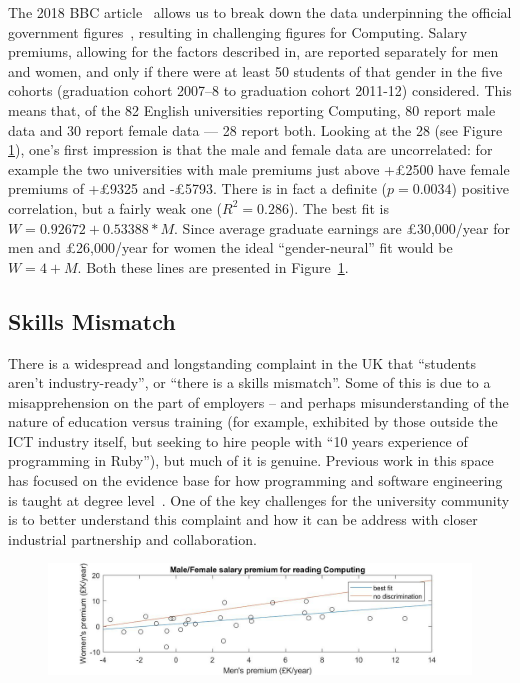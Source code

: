 \documentclass[conference]{IEEEtran}
\begin{document}
The 2018 BBC article~\cite{BBC2018f} allows us to break down the data
underpinning the official government figures~\cite{DfE2018d},
resulting in challenging figures for Computing. Salary premiums,
allowing for the factors described in\cite[\S IIB]{davenport-et-al:cep2019}, are reported separately for
men and women, and only if there were at least 50 students of that
gender in the five cohorts (graduation cohort 2007--8 to graduation
cohort 2011-12) considered. This means that, of the 82 English
universities reporting Computing, 80 report male data and 30 report
female data --- 28 report both. Looking at the 28 (see Figure
\ref{fig:BBC}), one's first impression is that the male and female
data are uncorrelated: for example the two universities with male
premiums just above +\pounds2500 have female premiums of +\pounds9325
and -\pounds5793. There is in fact a definite ($p=0.0034$) positive
correlation, but a fairly weak one ($R^2=0.286$). The best fit is
$W=0.92672+0.53388*M$. Since average
graduate earnings are \pounds30,000/year for men and
\pounds26,000/year for women \cite[p. 37]{DfE2018d}
the ideal ``gender-neural'' fit would be
$W=4+M$. Both these lines are presented in Figure~\ref{fig:BBC}.

\subsection{Skills Mismatch}\label{sec:Skills}

There is a widespread and longstanding complaint in the UK that
``students aren't industry-ready'', or ``there is a skills
mismatch''. Some of this is due to a misapprehension on the part of
employers -- and perhaps misunderstanding of the nature of education
versus training (for example, exhibited by those outside the ICT
industry itself, but seeking to hire people with ``10 years experience
of programming in Ruby''), but much of it is genuine. Previous work in
this space has focused on the evidence base for how programming and
software engineering is taught at degree
level~\cite{davenport-et-al:latice2016,murphy-et-al:programming2017,simon-et-al:sigcse2018}. One
of the key challenges for the university community is to better
understand this complaint and how it can be address with closer
industrial partnership and collaboration.

\begin{figure}
\includegraphics[width=\textwidth]{images/BBCSalaryDatav5.jpg}
\caption{\label{fig:BBC}}
\end{figure}
\end{document}
